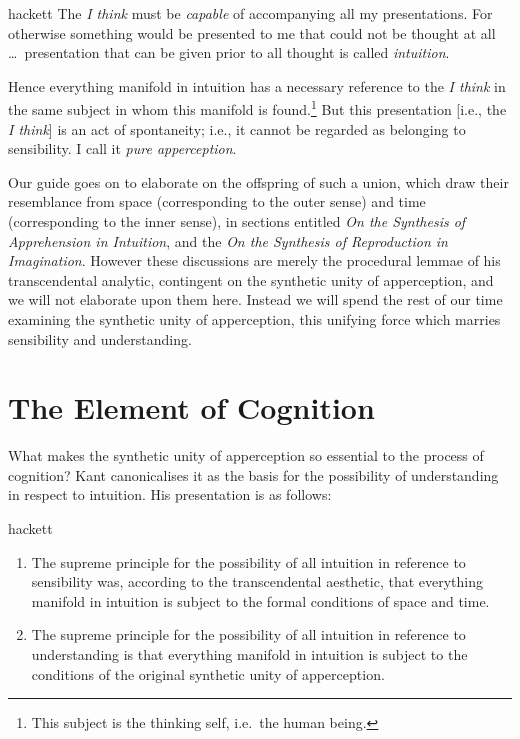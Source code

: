 \begin{displaycquote}[B132]{hackett}
  The \emph{I think} must be \emph{capable} of accompanying all my presentations. For otherwise something would be presented to me that could not be thought at all \ldots\ presentation that can be given prior to all thought is called \emph{intuition}.

  Hence everything manifold in intuition has a necessary reference to the \emph{I think} in the same subject in whom this manifold is found.\footnote{This subject is the thinking self, i.e.\ the human being.} But this presentation [i.e., the \emph{I think}] is an act of spontaneity; i.e., it cannot be regarded as belonging to sensibility. I call it \emph{pure apperception}.
\end{displaycquote}

\noindent
Our guide goes on to elaborate on the offspring of such a union, which draw their resemblance from space (corresponding to the outer sense) and time (corresponding to the inner sense), in sections entitled \emph{On the Synthesis of Apprehension in Intuition}, and the \emph{On the Synthesis of Reproduction in Imagination}. However these discussions are merely the procedural lemmae of his transcendental analytic, contingent on the synthetic unity of apperception, and we will not elaborate upon them here. Instead we will spend the rest of our time examining the synthetic unity of apperception, this unifying force which marries sensibility and understanding.

\section{The Element of Cognition}

What makes the synthetic unity of apperception so essential to the process of cognition? Kant canonicalises it as the basis for the possibility of understanding in respect to intuition. His presentation is as follows:
\begin{displaycquote}[B137]{hackett}%
  \begin{enumerate}[partopsep=0pt,topsep=0pt,parsep=0pt,align=left,labelsep=0pt,leftmargin=0pt]%
    \item The supreme principle for the possibility of all intuition in reference to sensibility was, according to the transcendental aesthetic, that everything manifold in intuition is subject to the formal conditions of space and time.
    \item The supreme principle for the possibility of all intuition in reference to understanding is that everything manifold in intuition is subject to the conditions of the original synthetic unity of apperception.
  \end{enumerate}
\end{displaycquote}

